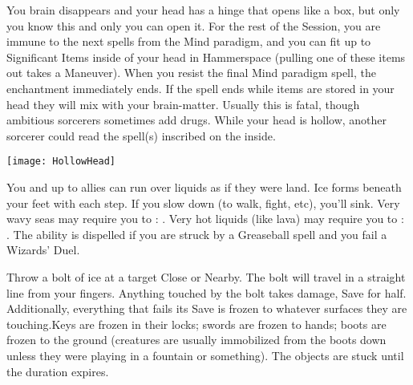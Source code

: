 {\SPELL[
  Name=Hollow Head,
  Link=wizardry-hollow-head,
  Paradigm=Biomancy,
  Save=N,
  Duration=Session,
  Counter=None ,
  Keywords=Hammerspace,
  Target=Self
]



You brain disappears and your head has a hinge that opens like a box, but
only you know this and only you can open it. For the rest of the Session,
you are immune to the next \DICE spells from the Mind paradigm, and you can
fit up to \SUMDICE Significant Items inside of your head in Hammerspace
(pulling one of these items out takes a Maneuver).  When you resist the
final Mind paradigm spell, the enchantment immediately ends. If the spell
ends while items are stored in your head they will mix with your
brain-matter. Usually this is fatal, though ambitious sorcerers sometimes
add drugs.  While your head is hollow, another sorcerer could read the
spell(s) inscribed on the inside.


  \begin{center}
  \texttt{[image: HollowHead]}
  \end{center}





\SPELL[
  Name=Ice Bridge Step,
  Link=wizardry-ice-bridge-step,
  Paradigm=Elements,
  Save=N,
  Duration=Session,
  Counter=\mylink{Greaseball}{wizardry-greaseball} ,
  Keywords=None,
  Target=Self
]



You and up to  allies can run over liquids as if they were land.  Ice
forms beneath your feet with each step. If you slow down (to walk, fight,
etc), you'll sink. Very wavy seas may require you to \RS : \DEX.  Very hot
liquids (like lava) may require you to \RS : \INT.  The ability is dispelled
if you are struck by a Greaseball spell and you fail a Wizards' Duel.





\SPELL[
  Name=Icebolt,
  Link=wizardry-icebolt,
  Paradigm=Elements,
  Save=Y (half),
  Duration=0 / Markovian,
  Counter=None ,
  Keywords=None,
  Target=Close or Nearby point (straight line)
]



Throw a bolt of ice at a target Close or Nearby.  The bolt will travel in a
straight line from your fingers.  Anything touched by the bolt takes
\SUMDICE damage, Save for half.  Additionally, everything that fails its
Save is frozen to whatever surfaces they are touching.Keys are frozen in
their locks; swords are frozen to hands; boots are frozen to the ground
(creatures are usually immobilized from the boots down unless they were
playing in a fountain or something).  The objects are stuck until the
duration expires.  




}
